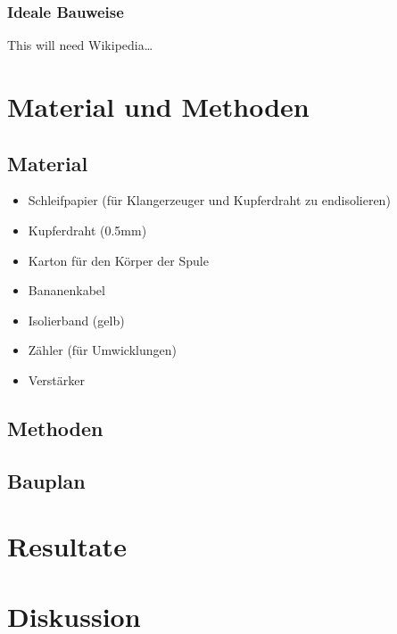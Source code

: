 \documentclass{report}
\begin{document}
\subsection{Ideale Bauweise}
This will need Wikipedia\dots

\chapter{Material und Methoden}
\section{Material}
\begin{itemize}[parsep=0pt]
    \item Schleifpapier (für Klangerzeuger und Kupferdraht zu endisolieren)
    \item Kupferdraht (0.5mm)
    \item Karton für den Körper der Spule
    \item Bananenkabel
    \item Isolierband (gelb)
    \item Zähler (für Umwicklungen)
    \item Verstärker
\end{itemize}
\section{Methoden}
\section{Bauplan}
\chapter{Resultate}
\chapter{Diskussion}
\newpage


\end{document}
